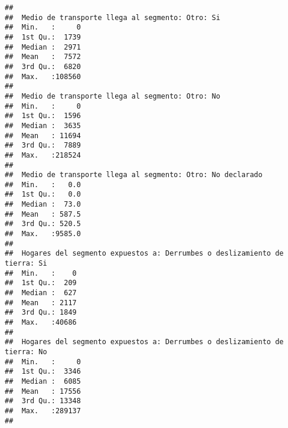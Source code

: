 \documentclass[11pt,]{article}
\begin{document}
\begin{verbatim}
##                                                                          
##  Medio de transporte llega al segmento: Otro: Si
##  Min.   :     0                                 
##  1st Qu.:  1739                                 
##  Median :  2971                                 
##  Mean   :  7572                                 
##  3rd Qu.:  6820                                 
##  Max.   :108560                                 
##                                                 
##  Medio de transporte llega al segmento: Otro: No
##  Min.   :     0                                 
##  1st Qu.:  1596                                 
##  Median :  3635                                 
##  Mean   : 11694                                 
##  3rd Qu.:  7889                                 
##  Max.   :218524                                 
##                                                 
##  Medio de transporte llega al segmento: Otro: No declarado
##  Min.   :   0.0                                           
##  1st Qu.:   0.0                                           
##  Median :  73.0                                           
##  Mean   : 587.5                                           
##  3rd Qu.: 520.5                                           
##  Max.   :9585.0                                           
##                                                           
##  Hogares del segmento expuestos a: Derrumbes o deslizamiento de tierra: Si
##  Min.   :    0                                                            
##  1st Qu.:  209                                                            
##  Median :  627                                                            
##  Mean   : 2117                                                            
##  3rd Qu.: 1849                                                            
##  Max.   :40686                                                            
##                                                                           
##  Hogares del segmento expuestos a: Derrumbes o deslizamiento de tierra: No
##  Min.   :     0                                                           
##  1st Qu.:  3346                                                           
##  Median :  6085                                                           
##  Mean   : 17556                                                           
##  3rd Qu.: 13348                                                           
##  Max.   :289137                                                           
##                                                                           

\end{verbatim}
\end{document}

